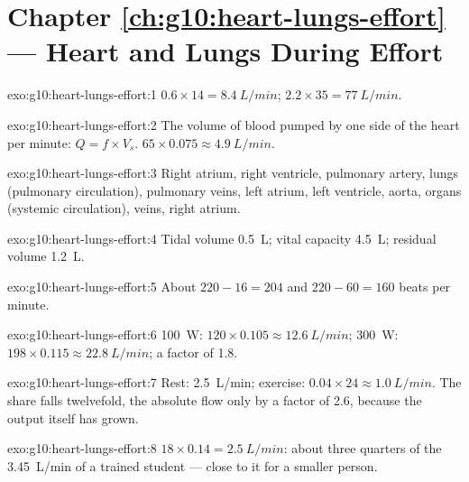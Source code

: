 \section*{Chapter \ref{ch:g10:heart-lungs-effort} --- Heart and Lungs During Effort}

\begin{solution}{exo:g10:heart-lungs-effort:1}
$0.6 \times 14 = \qty{8.4}{L/min}$; $2.2 \times 35 = \qty{77}{L/min}$.
\end{solution}

\begin{solution}{exo:g10:heart-lungs-effort:2}
The volume of blood pumped by one side of the heart per minute:
$Q = f \times V_s$. $65 \times 0.075 \approx \qty{4.9}{L/min}$.
\end{solution}

\begin{solution}{exo:g10:heart-lungs-effort:3}
Right atrium, right ventricle, pulmonary artery, lungs (pulmonary
circulation), pulmonary veins, left atrium, left ventricle, aorta,
organs (systemic circulation), veins, right atrium.
\end{solution}

\begin{solution}{exo:g10:heart-lungs-effort:4}
Tidal volume \qty{0.5}{L}; vital capacity \qty{4.5}{L}; residual
volume \qty{1.2}{L}.
\end{solution}

\begin{solution}{exo:g10:heart-lungs-effort:5}
About $220 - 16 = 204$ and $220 - 60 = 160$ beats per minute.
\end{solution}

\begin{solution}{exo:g10:heart-lungs-effort:6}
\qty{100}{W}: $120 \times 0.105 \approx \qty{12.6}{L/min}$;
\qty{300}{W}: $198 \times 0.115 \approx \qty{22.8}{L/min}$; a factor
of 1.8.
\end{solution}

\begin{solution}{exo:g10:heart-lungs-effort:7}
Rest: \qty{2.5}{L/min}; exercise: $0.04 \times 24 \approx
\qty{1.0}{L/min}$. The share falls twelvefold, the absolute flow only
by a factor of 2.6, because the output itself has grown.
\end{solution}

\begin{solution}{exo:g10:heart-lungs-effort:8}
$18 \times 0.14 = \qty{2.5}{L/min}$: about three quarters of the
\qty{3.45}{L/min} of a trained student --- close to it for a smaller
person.
\end{solution}


